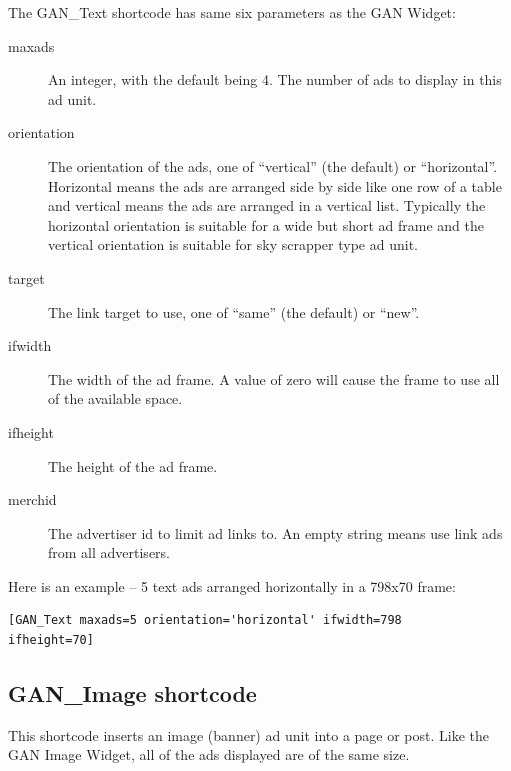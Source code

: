 \documentclass[letterpaper]{article}
\begin{document}
The GAN\_Text shortcode has same six parameters as the GAN
Widget:
\begin{description}
  \item[maxads] An integer, with the default being 4.
The number of ads to display in this ad unit.
  \item[orientation] The orientation of the ads, one of
``vertical'' (the default) or ``horizontal''. Horizontal means the ads are
arranged side by side like one row of a table and      vertical means
the ads are arranged in a vertical list. Typically the horizontal
orientation is suitable for a wide but short ad frame and the vertical
orientation is suitable for sky scrapper type ad unit.
  \item[target] The link target to use, one of ``same'' (the
default) or ``new''.
  \item[ifwidth] The width of the ad frame. A value
of zero will cause the frame to use all of the available space.
  \item[ifheight] The height of the ad frame.
  \item[merchid] The advertiser id to limit ad links to.  An empty string
means use link ads from all advertisers.
\end{description}

Here is an example -- 5 text ads arranged horizontally in a 798x70 frame:
\begin{verbatim}
[GAN_Text maxads=5 orientation='horizontal' ifwidth=798 
ifheight=70]
\end{verbatim}

\subsection{GAN\_Image shortcode}

This shortcode inserts an image (banner) ad unit into a page or post.
Like the GAN Image Widget, all of the ads displayed are of the same
size. 
\end{document}
